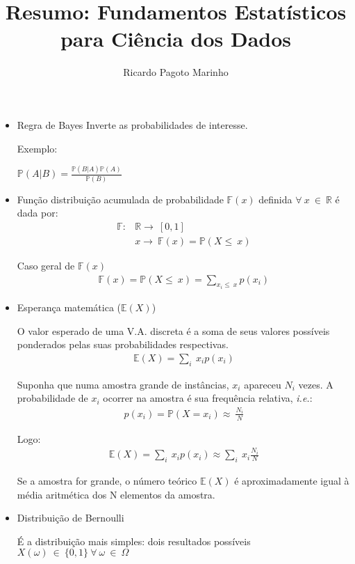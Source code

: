\documentclass[11pt,a4paper]{book}
\title{Resumo: Fundamentos Estatísticos para Ciência dos Dados}
\author{Ricardo Pagoto Marinho}
\begin{document}
\maketitle
	\begin{itemize}
		\item Regra de Bayes
		Inverte as probabilidades de interesse.
		
		Exemplo:
		
		$\mathbb{P}(A|B) = \frac{\mathbb{P}(B|A)\mathbb{P}(A)}{\mathbb{P}(B)}$
		
		\item Função distribuição acumulada de probabilidade
		$\mathbb{F}(x)$ definida $\forall~x~\in~\mathbb{R}$ é dada por:
		\begin{align*}
			\mathbb{F}: & \mathbb{R}\rightarrow~[0,1]\\
			& x\rightarrow~\mathbb{F}(x)=\mathbb{P}(X\leq~x)
		\end{align*}
		
		Caso geral de $\mathbb{F}(x)$
		\begin{align*}
			\mathbb{F}(x)=\mathbb{P}(X\leq~x)=\sum_{x_i\leq~x}p(x_i)
		\end{align*}
		
		\item Esperança matemática ($\mathbb{E}(X)$)
		
		O valor esperado de uma V.A. discreta é a soma de seus valores possíveis ponderados pelas suas probabilidades respectivas.
		\begin{align*}
			\mathbb{E}(X)=\sum_i~x_ip(x_i)
		\end{align*}
		
		Suponha que numa amostra grande de instâncias, $x_i$ apareceu $N_i$ vezes.
		A probabilidade de $x_i$ ocorrer na amostra é sua frequência relativa, \textit{i.e.}:
		\begin{align*}
			p(x_i)=\mathbb{P}(X=x_i)\approx~\frac{N_i}{N}
		\end{align*}
		
		Logo:
		\begin{align*}
			\mathbb{E}(X)=\sum_i~x_ip(x_i)\approx \sum_i~x_i\frac{N_i}{N}
		\end{align*}
		
		Se a amostra for grande, o número teórico $\mathbb{E}(X)$ é aproximadamente igual à média aritmética dos N elementos da amostra.
		
		\item Distribuição de Bernoulli
		
		É a distribuição mais simples: dois resultados possíveis
		$X(\omega)~\in~\lbrace0,1\rbrace~\forall~\omega~\in~\Omega$
		

\end{itemize}
\end{document}
